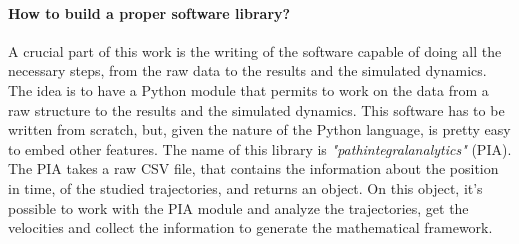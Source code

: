 \documentclass[class=article, crop=false]{standalone}
\begin{document}
\paragraph{How to build a proper software library?}
A crucial part of this work is the writing of the software capable of doing all the necessary steps, from the raw data to the results and the simulated dynamics.
The idea is to have a Python module that permits to work on the data from a raw structure to the results and the simulated dynamics.
This software has to be written from scratch, but, given the nature of the Python language, is pretty easy to embed other features.
The name of this library is \emph{"pathintegralanalytics"} (PIA).
The PIA takes a raw CSV file, that contains the information about the position in time, of the studied trajectories, and returns an object.
On this object, it's possible to work with the PIA module and analyze the trajectories, get the velocities and collect the information to generate the mathematical framework.



\end{document}
